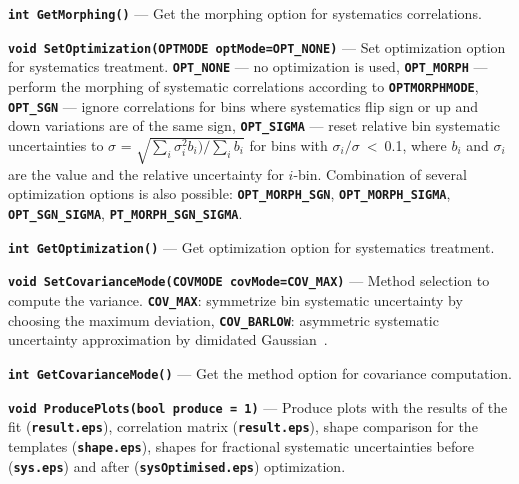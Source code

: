 \documentclass[12pt]{article}
\newcommand\verbbf[1]{\textcolor[rgb]{0,0,1}{\texttt{\textbf{#1}}}}
\newcommand\verbbfb[1]{\textcolor[rgb]{0,0,0}{\texttt{\textbf{#1}}}}
\begin{document}
\vspace{0.3cm}

\noindent \verbbf{int GetMorphing()} --- Get the morphing option for
systematics correlations.

\vspace{0.3cm}

\noindent \verbbf{void SetOptimization(OPTMODE optMode=OPT\_NONE)} --- Set
optimization option for systematics treatment. \verbbfb{OPT\_NONE} --- no
optimization is used, \verbbfb{OPT\_MORPH} --- perform the morphing of systematic
correlations according to \verbbfb{OPTMORPHMODE}, \verbbfb{OPT\_SGN} --- ignore
correlations for bins where systematics flip sign or up and down
variations are of the same sign, \verbbfb{OPT\_SIGMA} --- reset
relative bin systematic uncertainties to $\sigma$ =
$\sqrt{\sum\limits_{i}^{}\sigma_{i}^{2}b_{i})/\sum\limits_{i}^{}b_{i}}$
for bins with $\sigma_{i}/\sigma$~<~0.1, where $b_{i}$ and
$\sigma_{i}$ are the value and the relative uncertainty for $i$-bin.
Combination of several optimization options is also possible:
\verbbfb{OPT\_MORPH\_SGN}, \verbbfb{OPT\_MORPH\_SIGMA}, \verbbfb{OPT\_SGN\_SIGMA},
\verbbfb{PT\_MORPH\_SGN\_SIGMA}.

\vspace{0.3cm}

\noindent \verbbf{int GetOptimization()} --- Get optimization option
for systematics treatment.

\vspace{0.3cm}

\noindent \verbbf{void SetCovarianceMode(COVMODE covMode=COV\_MAX)} ---
Method selection to compute the variance. \verbbfb{COV\_MAX}:
symmetrize bin systematic uncertainty by choosing the maximum deviation,
\verbbfb{COV\_BARLOW}: asymmetric systematic uncertainty approximation 
by dimidated Gaussian~\cite{Barlow}.

\vspace{0.3cm}

\noindent \verbbf{int GetCovarianceMode()} --- Get the method option for
covariance computation.

\vspace{0.3cm}

\noindent \verbbf{void ProducePlots(bool produce = 1)} --- Produce plots
with the results of the fit (\verbbfb{result.eps}), 
correlation matrix (\verbbfb{result.eps}), shape comparison for the
templates (\verbbfb{shape.eps}), shapes for fractional systematic
uncertainties before (\verbbfb{sys.eps}) and after
(\verbbfb{sysOptimised.eps}) optimization.
\end{document}
